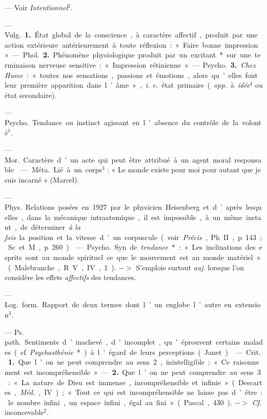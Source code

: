 \begin{itemize}[leftmargin=1cm, label=, itemsep=1pt]
 — Voir {\it Intentionnel}$^2$.

 — \si{Vulg.} {\bf 1.} État global de la conscience, à
caractère affectif, produit par une action extérieure antérieurement à toute
réflexion : « Faire bonne impression ».

— \si{Phol.} {\bf 2.} Phénomène physiologique produit par un excitant* sur
une terminaison nerveuse sensitive : « Impression rétinienne ».

— \si{Psycho.} {\bf 3.} {\it Chez Hume} : « toutes nos sensations, passions
et émotions, alors qu’elles font leur première
apparition dans l’âme », {\it i. e.} état primaire ({\it opp.} à
{\it idée}$^4$ ou état secondaire).

 — \si{Psycho.} Tendance ou instinct agissant en l'absence du
contrôle de la volonté$^1$.

 — \si{Mor.} Caractère d’un acte qui peut être attribué à un
agent moral responsable.

 — \si{Méta.} Lié à un corps$^3$ : « Le monde existe pour moi
pour autant que je suis incarné » (Marcel).

 — \si{Phys.} Relations posées en 1927 par le
physicien Heisenberg et d’après lesquelles, dans la mécanique intraatomique,
il est impossible, à un même instant, de déterminer {\it à la fois} la
position et la vitesse d’un corpuscule (voir {\it Précis}, Ph. II, p. 143 ;
Sc. et M., p. 260).

 — \si{Psycho.} Syn. de {\it tendance}* : « Les inclinations
des esprits sont au monde spirituel ce que le mouvement est au monde
matériel » (Malebranche, R. V., IV, 1). $->$ S'emploie surtout {\it auj.}
lorsque l’on considère les effets {\it affectifs} des tendances.

 — \si{Log.} \si{form.} Rapport de deux termes dont l’un
englobe l’autre en extension$^3$.

 — \si{Ps. path.} Sentiments d’inachevé,
d'incomplet, qu'éprouvent certains malades (cf. {\it Psychasthénie}*) à
l'égard de leurs perceptions (Janet).

 — \si{Crit.} {\bf 1.} Que l’on ne peut comprendre au
sens 2, inintelligible : « Ce raisonnement est incompréhensible ». — {\bf 2.}
Que l’on ne peut comprendre au sens 3 : « La nature de Dieu est immense,
incompréhensible et infinie » (Descartes,
{\it Méd.}, IV) ; « Tout ce qui est incompréhensible ne laisse pas d’être :
le nombre infini, un espace infini, égal au fini » (Pascal, 430).
$->$ {\it Cf.} inconcevable$^2$.


\end{itemize}
